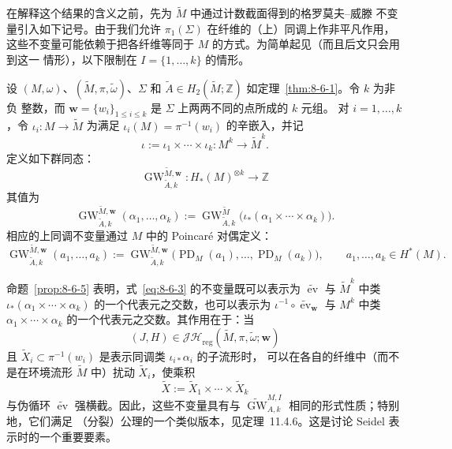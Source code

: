 在解释这个结果的含义之前，先为 $\widetilde M$ 中通过计数截面得到的格罗莫夫--威滕
不变量引入如下记号。由于我们允许 $\pi_1(\Sigma)$ 在纤维的（上）同调上作非平凡作用，
这些不变量可能依赖于把各纤维等同于 $M$ 的方式。为简单起见（而且后文只会用到这一
情形），以下限制在 $I=\{1,\ldots,k\}$ 的情形。

\begin{definition}\label{def:8-6-6}
设 $(M,\omega)$、$(\widetilde M,\pi,\widetilde\omega)$、$\Sigma$ 和
$\widetilde A\in H_2(\widetilde M;\mathbb Z)$ 如定理~\ref{thm:8-6-1}。令 $k$ 为非负
整数，而 $\mathbf w=\{w_i\}_{1\le i\le k}$ 是 $\Sigma$ 上两两不同的点所成的 $k$ 元组。
对 $i=1,\ldots,k$，令 $\iota_i:M\to\widetilde M$ 为满足
$\iota_i(M)=\pi^{-1}(w_i)$ 的辛嵌入，并记
\[
  \iota:=\iota_1\times\cdots\times\iota_k:
  M^k\longrightarrow\widetilde M^k.
\]
定义如下群同态：
\[
  \operatorname{GW}^{\widetilde M,\mathbf w}_{\widetilde A,k}:
  H_*(M)^{\otimes k}\longrightarrow\mathbb Z
\] 其值为
\begin{equation}\label{eq:8-6-3}
  \operatorname{GW}^{\widetilde M,\mathbf w}_{\widetilde A,k}
  (\alpha_1,\ldots,\alpha_k)
  :=\operatorname{GW}^{\widetilde M}_{\widetilde A,k}
  \bigl(\iota_*(\alpha_1\times\cdots\times\alpha_k)\bigr).
\end{equation}
相应的上同调不变量通过 $M$ 中的 Poincaré 对偶定义：
\[
  \operatorname{GW}^{\widetilde M,\mathbf w}_{\widetilde A,k}
  (a_1,\ldots,a_k)
  :=\operatorname{GW}^{\widetilde M,\mathbf w}_{\widetilde A,k}
  \bigl(\operatorname{PD}_M(a_1),\ldots,\operatorname{PD}_M(a_k)\bigr),
  \qquad a_1,\ldots,a_k\in H^*(M).
\]
\end{definition}

命题~\ref{prop:8-6-5} 表明，式~\eqref{eq:8-6-3} 的不变量既可以表示为
$\widetilde{\operatorname{ev}}$ 与 $\widetilde M^k$ 中类
$\iota_*(\alpha_1\times\cdots\times\alpha_k)$ 的一个代表元之交数，也可以表示为
$\iota^{-1}\circ\widetilde{\operatorname{ev}}_{\mathbf w}$ 与 $M^k$ 中类
$\alpha_1\times\cdots\times\alpha_k$ 的一个代表元之交数。其作用在于：当
\[
  (J,H)\in\mathcal{JH}_{\mathrm{reg}}
  (\widetilde M,\pi,\widetilde\omega;\mathbf w)
\]
且 $\widetilde X_i\subset\pi^{-1}(w_i)$ 是表示同调类 $\iota_{i*}\alpha_i$ 的子流形时，
可以在各自的纤维中（而不是在环境流形 $\widetilde M$ 中）扰动
$\widetilde X_i$，使乘积
\[
  \widetilde X:=\widetilde X_1\times\cdots\times\widetilde X_k
\]
与伪循环 $\widetilde{\operatorname{ev}}$ 强横截。因此，这些不变量具有与
$\widetilde{\operatorname{GW}}^{M,I}_{A,k}$ 相同的形式性质；特别地，它们满足
（分裂）公理的一个类似版本，见定理~11.4.6。这是讨论 Seidel 表示时的一个重要要素。

